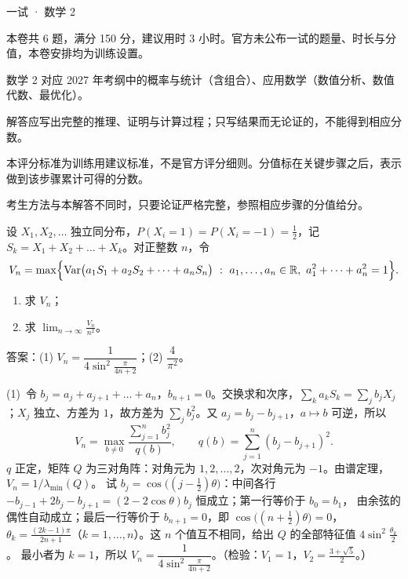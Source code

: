 \documentclass[cjk=noto, seal=first]{mojing-exam}
\begin{document}
\begin{paper}[time={建议 3 小时（训练设置）}, full=150]{一试 · 数学 2}

\begin{instructions}
  \item 本卷共 6 题，满分 150 分，建议用时 3 小时。官方未公布一试的题量、时长与分值，本卷安排均为训练设置。
  \item 数学 2 对应 2027 年考纲中的概率与统计（含组合）、应用数学（数值分析、数值代数、最优化）。
  \item 解答应写出完整的推理、证明与计算过程；只写结果而无论证的，不能得到相应分数。
\end{instructions}

\begin{gradingnotes}
  \item 本评分标准为训练用建议标准，不是官方评分细则。分值标在关键步骤之后，表示做到该步骤累计可得的分数。
  \item 考生方法与本解答不同时，只要论证严格完整，参照相应步骤的分值给分。
\end{gradingnotes}


\begin{questions}

\question[25]
设 $X_1,X_2,\dots$ 独立同分布，$P(X_i=1)=P(X_i=-1)=\frac12$，记 $S_k=X_1+X_2+\dots+X_k$。对正整数 $n$，令
\[
  V_n=\max\Bigl\{\operatorname{Var}\bigl(a_1S_1+a_2S_2+\dots+a_nS_n\bigr)\ :\ a_1,\dots,a_n\in\R,\ a_1^2+\dots+a_n^2=1\Bigr\}.
\]
\begin{enumerate}
  \item 求 $V_n$；
  \item 求 $\displaystyle\lim_{n\to\infty}\frac{V_n}{n^2}$。
\end{enumerate}
\answerspace{2cm}
\begin{solution}
答案：(1) $V_n=\dfrac{1}{4\sin^2\frac{\pi}{4n+2}}$；(2) $\dfrac4{\pi^2}$。

(1)~令 $b_j=a_j+a_{j+1}+\dots+a_n$，$b_{n+1}=0$。交换求和次序，$\sum_ka_kS_k=\sum_jb_jX_j$；$X_j$ 独立、方差为 $1$，故方差为
$\sum_jb_j^2$。又 $a_j=b_j-b_{j+1}$，$a\mapsto b$ 可逆，所以
\[
  V_n=\max_{b\ne0}\frac{\sum_{j=1}^nb_j^2}{q(b)},\qquad q(b)=\sum_{j=1}^n(b_j-b_{j+1})^2 .
\]
$q$ 正定，矩阵 $Q$ 为三对角阵：对角元为 $1,2,\dots,2$，次对角元为 $-1$。由谱定理，$V_n=1/\lambda_{\min}(Q)$。
试 $b_j=\cos\bigl((j-\frac12)\theta\bigr)$：中间各行 $-b_{j-1}+2b_j-b_{j+1}=(2-2\cos\theta)b_j$ 恒成立；第一行等价于 $b_0=b_1$，
由余弦的偶性自动成立；最后一行等价于 $b_{n+1}=0$，即 $\cos\bigl((n+\frac12)\theta\bigr)=0$，
$\theta_k=\frac{(2k-1)\pi}{2n+1}$（$k=1,\dots,n$）。这 $n$ 个值互不相同，给出 $Q$ 的全部特征值 $4\sin^2\frac{\theta_k}{2}$。
最小者为 $k=1$，所以 $V_n=\dfrac1{4\sin^2\frac{\pi}{4n+2}}$。（检验：$V_1=1$，$V_2=\frac{3+\sqrt5}2$。）


\end{solution}
\end{questions}
\end{paper}
\end{document}
